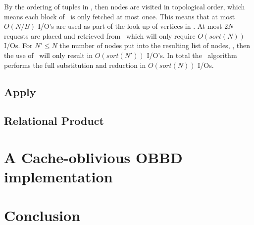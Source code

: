 By the ordering of tuples in \Q, then nodes are visited in topological order,
which means each block of \GV\ is only fetched at most once. This means that at
most $O(N/B)$ I/O's are used as part of the look up of vertices in \GV. At most
$2N$ requests are placed and retrieved from \Q\ which will only require
$O(sort(N))$ I/Os. For $N' \leq N$ the number of nodes put into the resulting
list of nodes, \ReduceLwork, then the use of \Reduce\ will only result in
$O(sort(N'))$ I/O's. In total the \Substitute\ algorithm performs the full
substitution and reduction in $O(sort(N))$ I/Os.

\clearpage
\subsection{Apply}


\subsection{Relational Product}


\section{A Cache-oblivious OBBD implementation} \label{sec:implementation}


\section{Conclusion} \label{sec:conclusion}


\printbibliography




